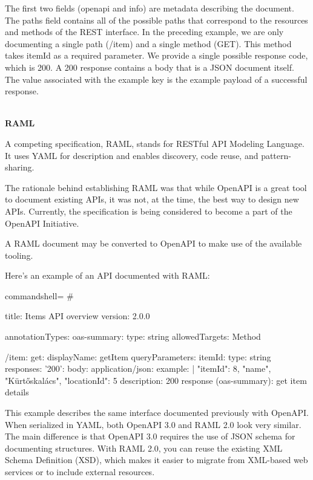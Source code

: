 The first two fields (openapi and info) are metadata describing the document. The paths field contains all of the possible paths that correspond to the resources and methods of the REST interface. In the preceding example, we are only documenting a single path (/item) and a single method (GET). This method takes itemId as a required parameter. We provide a single possible response code, which is 200. A 200 response contains a body that is a JSON document itself. The value associated with the example key is the example payload of a successful response.

\hspace*{\fill} \\ %
\noindent
\textbf{RAML}

A competing specification, RAML, stands for RESTful API Modeling Language. It uses YAML for description and enables discovery, code reuse, and pattern-sharing.

The rationale behind establishing RAML was that while OpenAPI is a great tool to document existing APIs, it was not, at the time, the best way to design new APIs. Currently, the specification is being considered to become a part of the OpenAPI Initiative.

A RAML document may be converted to OpenAPI to make use of the available tooling.

Here's an example of an API documented with RAML:

\begin{tcblisting}{commandshell={}}
#%

title: Items API overview
version: 2.0.0

annotationTypes:
  oas-summary:
    type: string
    allowedTargets: Method

/item:
  get:
    displayName: getItem
    queryParameters:
      itemId:
        type: string
    responses:
     '200':
       body:
         application/json:
           example: |
             {
               "itemId": 8,
               "name", "Kürtőskalács",
               "locationId": 5
             }
       description: 200 response
    (oas-summary): get item details
\end{tcblisting}

This example describes the same interface documented previously with OpenAPI. When serialized in YAML, both OpenAPI 3.0 and RAML 2.0 look very similar. The main difference is that OpenAPI 3.0 requires the use of JSON schema for documenting structures. With RAML 2.0, you can reuse the existing XML Schema Definition (XSD), which makes it easier to migrate from XML-based web services or to include external resources.

